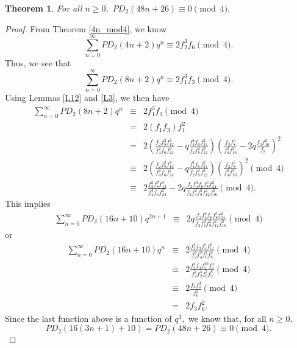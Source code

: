 \documentclass{amsart}
\newtheorem{theorem}{Theorem}[section]
\begin{document}
\begin{theorem}
For all $n\geq 0,$ $PD_2(48n+26) \equiv 0 \pmod{4}.$    
\end{theorem}
\begin{proof}
From Theorem \ref{4n_mod4}, we know 
$$
\sum_{n=0}^{\infty} PD_2(4n+2)q^n  \equiv 2f_2^3f_6 \pmod{4}. 
$$ 
Thus, we see that 
$$
\sum_{n=0}^{\infty} PD_2(8n+2)q^n  \equiv 2f_1^3f_3 \pmod{4}.
$$ 
Using Lemmas \ref{L12} and \ref{L3}, we then have 
\begin{eqnarray*}
\sum_{n=0}^{\infty} PD_2(8n+2)q^n  
&\equiv & 
2f_1^3f_3 \pmod{4} \\
&= &
2(f_1f_3)f_1^2 \\
&=& 
2\left( \frac{f_2f_8^2f_{12}^4}{f_4^2f_6f_{24}^2} - q \frac{f_4^4f_6f_{24}^2}{f_2f_8^2f_{12}^2} \right)\left( \frac{f_2f_8^5}{f_4^2f_{16}^2} - 2q \frac{f_2f_{16}^2}{f_8} \right)^2 \\
&\equiv & 
2\left( \frac{f_2f_8^2f_{12}^4}{f_4^2f_6f_{24}^2} - q \frac{f_4^4f_6f_{24}^2}{f_2f_8^2f_{12}^2} \right)\left( \frac{f_2f_8^5}{f_4^2f_{16}^2}\right)^2 \pmod{4} \\
&\equiv & 
2\frac{f_2^2f_8^7f_{12}^4}{f_4^4f_6f_{24}^2} - 2q \frac{f_2f_4^4f_6f_8^5f_{24}^2}{f_2f_4^2f_8^2f_{12}^2f_{16}^2}  \pmod{4}.
\end{eqnarray*}
This implies 
\begin{eqnarray*}
\sum_{n=0}^{\infty} PD_2(16n+10)q^{2n+1}  
&\equiv & 
2q \frac{f_2f_4^4f_6f_8^5f_{24}^2}{f_2f_4^2f_8^2f_{12}^2f_{16}^2}  \pmod{4}
\end{eqnarray*}
or 
\begin{eqnarray*}
\sum_{n=0}^{\infty} PD_2(16n+10)q^{n}  
&\equiv & 
2\frac{f_2^4f_3f_4^5f_{12}^2}{f_2^2f_4^2f_{6}^2f_{8}^2}  \pmod{4} \\
&\equiv & 
2\frac{f_2^4f_3f_2^{10}f_{6}^4}{f_2^2f_2^4f_{6}^2f_{2}^8}  \pmod{4} \\
&\equiv & 
2\frac{f_3f_{6}^4}{f_{6}^2}  \pmod{4} \\
&=& 
2f_3f_6^2.
\end{eqnarray*}
Since the last function above is a function of $q^3,$ we know that, for all $n\geq 0,$
$$PD_2(16(3n+1)+10) = PD_2(48n+26) \equiv 0 \pmod{4}.$$
\end{proof}



\end{document}
